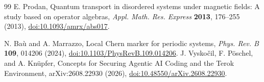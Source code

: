 \begin{thebibliography}{99}
E. Prodan, Quantum transport in disordered systems under magnetic fields:
A study based on operator algebras,
\emph{Appl. Math. Res. Express} \textbf{2013}, 176--255 (2013),
\href{https://doi.org/10.1093/amrx/abs017}{doi:10.1093/amrx/abs017}.

N. Ba\`u and A. Marrazzo, Local Chern marker for periodic systems,
\emph{Phys. Rev. B} \textbf{109}, 014206 (2024),
\href{https://doi.org/10.1103/PhysRevB.109.014206}{doi:10.1103/PhysRevB.109.014206}.
 J. Vysko\v{c}il, F. P\"oschel, and A. Kn\"upfer, Concepts for Securing Agentic AI Coding and the Terok Environment, arXiv:2608.22930 (2026), \href{https://doi.org/10.48550/arXiv.2608.22930}{doi:10.48550/arXiv.2608.22930}.

\end{thebibliography}
